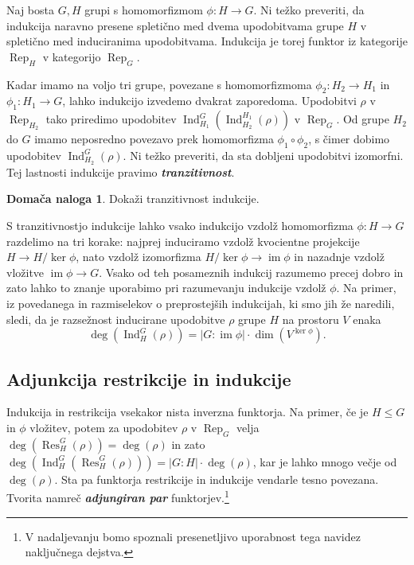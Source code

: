 \documentclass[11pt]{book}
\DeclareMathOperator\image{im}
\DeclareMathOperator\Res{Res}
\DeclareMathOperator\Ind{Ind}
\DeclareMathOperator\Rep{Rep}
\def\definicija{\color{rdeca}\bf\em}
\theoremstyle{definition}
\theoremstyle{zgled}
\theoremstyle{odprtproblem}
\theoremstyle{domacanaloga}
\newtheorem*{domacanaloga}{Domača naloga}
\theoremstyle{izrek}
\begin{document}
Naj bosta $G,H$ grupi s homomorfizmom $\phi \colon H \to G$. Ni težko preveriti, da indukcija naravno presene spletično med dvema upodobitvama grupe $H$ v spletično med induciranima upodobitvama. Indukcija je torej funktor iz kategorije $\Rep_H$ v kategorijo $\Rep_G$.

Kadar imamo na voljo tri grupe, povezane s homomorfizmoma $\phi_2 \colon H_2 \to H_1$ in $\phi_1 \colon H_1 \to G$, lahko indukcijo izvedemo dvakrat zaporedoma. Upodobitvi $\rho$ v $\Rep_{H_2}$ tako priredimo upodobitev $\Ind^{G}_{H_1}(\Ind^{H_1}_{H_2}(\rho))$ v $\Rep_{G}$. Od grupe $H_2$ do $G$ imamo neposredno povezavo prek homomorfizma $\phi_1 \circ \phi_2$, s čimer dobimo upodobitev $\Ind^G_{H_2}(\rho)$. Ni težko preveriti, da sta dobljeni upodobitvi izomorfni. Tej lastnosti indukcije pravimo {\definicija tranzitivnost}.

\begin{domacanaloga}
    Dokaži tranzitivnost indukcije.
\end{domacanaloga}

S tranzitivnostjo indukcije lahko vsako indukcijo vzdolž homomorfizma $\phi \colon H \to G$ razdelimo na tri korake: najprej induciramo vzdolž kvocientne projekcije $H \to H/\ker \phi$, nato vzdolž izomorfizma $H/\ker \phi \to \image \phi$ in nazadnje vzdolž vložitve $\image \phi \to G$. Vsako od teh posameznih indukcij razumemo precej dobro in zato lahko to znanje uporabimo pri razumevanju indukcije vzdolž $\phi$. Na primer, iz povedanega in razmiselekov o preprostejših indukcijah, ki smo jih že naredili, sledi, da je razsežnost inducirane upodobitve $\rho$ grupe $H$ na prostoru $V$ enaka
\[
    \textstyle \deg(\Ind^G_H(\rho)) = 
    |G:\image \phi| \cdot \dim(V^{\ker \phi}).
\]

\subsection{Adjunkcija restrikcije in indukcije}

Indukcija in restrikcija vsekakor nista inverzna funktorja. Na primer, če je $H \leq G$ in $\phi$ vložitev, potem za upodobitev $\rho$ v $\Rep_G$ velja $\deg(\Res^G_H(\rho)) = \deg(\rho)$ in zato $\deg(\Ind^G_H(\Res^G_H(\rho))) = |G:H| \cdot \deg(\rho)$, kar je lahko mnogo večje od $\deg(\rho)$. Sta pa funktorja restrikcije in indukcije vendarle tesno povezana. Tvorita namreč {\definicija adjungiran par} funktorjev.\footnote{V nadaljevanju bomo spoznali presenetljivo uporabnost tega navidez naključnega dejstva.}
\end{document}
